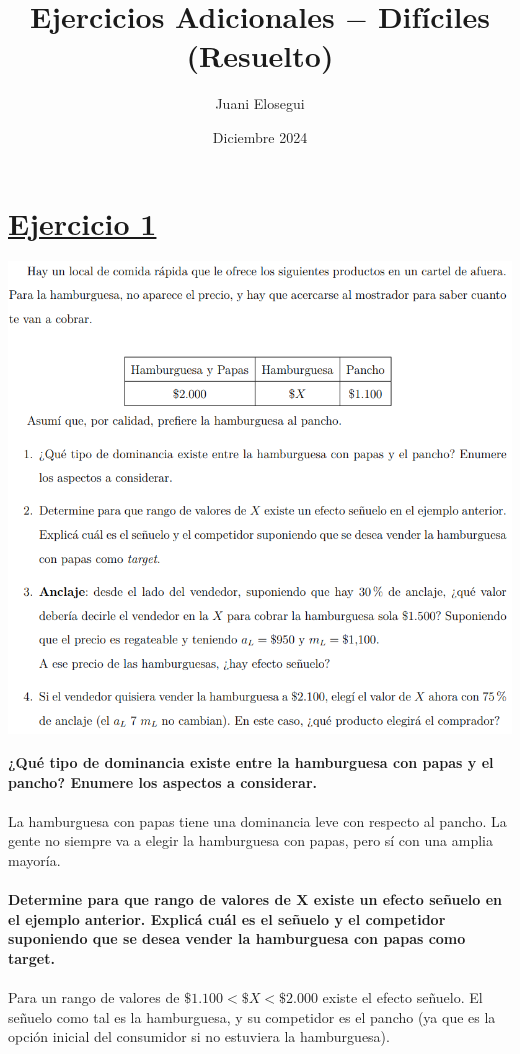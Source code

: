 \documentclass{article}
\title{Ejercicios Adicionales $-$ Difíciles (Resuelto)}
\author{Juani Elosegui}
\date{Diciembre 2024}
\begin{document}
    
    \maketitle

    \section*{\underline{Ejercicio 1}}
        \begin{center}
            \includegraphics[width=0.8 \linewidth]{figs/adicionales-dificiles-uno.png}
        \end{center}
        \textbf{¿Qué tipo de dominancia existe entre la hamburguesa con papas y el pancho? Enumere los aspectos a considerar.}
        \\
        \\
        La hamburguesa con papas tiene una dominancia leve con respecto al pancho. La gente no siempre va a elegir la hamburguesa con papas, pero sí con una amplia mayoría.
        \\
        \\
        \textbf{Determine para que rango de valores de X existe un efecto señuelo en el ejemplo anterior. Explicá cuál es el señuelo y el competidor suponiendo que se desea vender la hamburguesa con papas como target.}
        \\
        \\
        Para un rango de valores de \(\mathdollar 1.100 < \mathdollar X < \mathdollar 2.000\) existe el efecto señuelo. El señuelo como tal es la hamburguesa, y su competidor es el pancho (ya que es la opción inicial del consumidor si no estuviera la hamburguesa).
        
\end{document}
